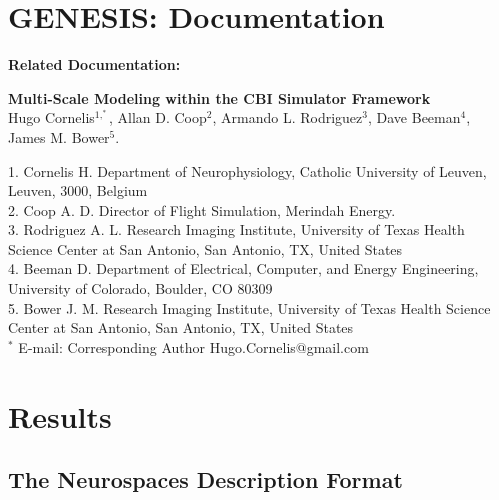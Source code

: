 \documentclass[12pt]{article}
\begin{document}
\section*{GENESIS: Documentation}

{\bf Related Documentation:}


\begin{flushleft}
{\Large
\textbf{Multi-Scale Modeling within the CBI Simulator Framework}
}
\\
Hugo Cornelis$^{1,^\ast}$, 
Allan D. Coop$^{2}$,
Armando L. Rodriguez$^{3}$, 
Dave Beeman$^{4}$,
James M. Bower$^{5}$.
\\
\vspace*{5mm}
\begin{small}
{1.} Cornelis H. Department of Neurophysiology, Catholic University of Leuven, Leuven, 3000, Belgium
\\
{2.} Coop A. D. Director of Flight Simulation, Merindah Energy.
\\
{3.} Rodriguez A. L. Research Imaging Institute, University of Texas Health Science Center at San Antonio, San Antonio, TX, United States
\\
{4.} Beeman D. Department of Electrical, Computer, and Energy Engineering, University of Colorado, Boulder, CO 80309
\\
{5.} Bower J. M. Research Imaging Institute, University of Texas Health Science Center at San Antonio, San Antonio, TX, United States
\\
$^\ast$ E-mail: Corresponding Author Hugo.Cornelis@gmail.com
\end{small}
\end{flushleft}

\newpage

\tableofcontents

\newpage

\section{Results}

\subsection{The Neurospaces Description Format}
\end{document}
